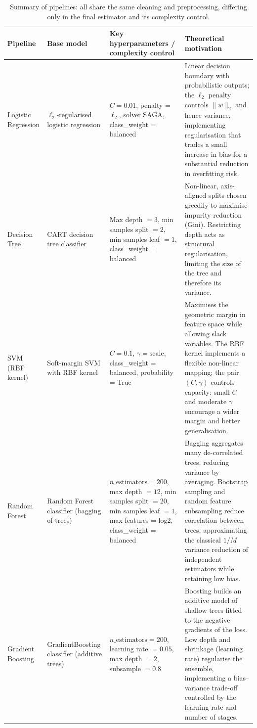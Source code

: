\documentclass[11pt,a4paper]{article}
\begin{document}
\begin{table}[h]
    \centering
    \small
    \begin{tabular}{@{}p{2.7cm}p{3.2cm}p{4.2cm}p{4.2cm}@{}}
        \toprule
        \textbf{Pipeline} & \textbf{Base model} & \textbf{Key hyperparameters / complexity control} & \textbf{Theoretical motivation} \\
        \midrule
        Logistic Regression &
        $\ell_2$-regularised logistic regression &
        $C = 0.01$, penalty = $\ell_2$, solver SAGA, class\_weight = balanced &
        Linear decision boundary with probabilistic outputs; the $\ell_2$ penalty controls $\lVert w \rVert_2$ and hence variance, implementing regularisation that trades a small increase in bias for a substantial reduction in overfitting risk. \\
        \midrule
        Decision Tree &
        CART decision tree classifier &
        Max depth $=3$, min samples split $=2$, min samples leaf $=1$, class\_weight = balanced &
        Non-linear, axis-aligned splits chosen greedily to maximise impurity reduction (Gini). Restricting depth acts as structural regularisation, limiting the size of the tree and therefore its variance. \\
        \midrule
        SVM (RBF kernel) &
        Soft-margin SVM with RBF kernel &
        $C=0.1$, $\gamma=\text{scale}$, class\_weight = balanced, probability = True &
        Maximises the geometric margin in feature space while allowing slack variables. The RBF kernel implements a flexible non-linear mapping; the pair $(C,\gamma)$ controls capacity: small $C$ and moderate $\gamma$ encourage a wider margin and better generalisation. \\
        \midrule
        Random Forest &
        Random Forest classifier (bagging of trees) &
        $n\_{\text{estimators}}=200$, max depth $=12$, min samples split $=20$, min samples leaf $=1$, max features = log2, class\_weight = balanced &
        Bagging aggregates many de-correlated trees, reducing variance by averaging. Bootstrap sampling and random feature subsampling reduce correlation between trees, approximating the classical $1/M$ variance reduction of independent estimators while retaining low bias. \\
        \midrule
        Gradient Boosting &
        GradientBoosting classifier (additive trees) &
        $n\_{\text{estimators}}=200$, learning rate $=0.05$, max depth $=2$, subsample $=0.8$ &
        Boosting builds an additive model of shallow trees fitted to the negative gradients of the loss. Low depth and shrinkage (learning rate) regularise the ensemble, implementing a bias–variance trade-off controlled by the learning rate and number of stages. \\
        \bottomrule
    \end{tabular}
    \caption{Summary of pipelines: all share the same cleaning and preprocessing, differing only in the final estimator and its complexity control.}
    \label{tab:pipelines}
\end{table}
\end{document}
